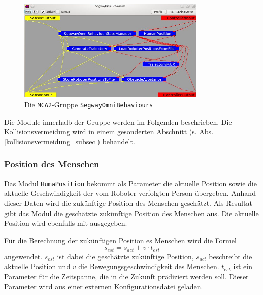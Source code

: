 \begin{figure}[h]
	\center
	\includegraphics[width=0.8\textwidth]{graphics/behaviours}
	\caption{Die \lstinline{MCA2}-Gruppe \lstinline{SegwayOmniBehaviours}}
	\label{fig:behaviours}
\end{figure}

Die Module innerhalb der Gruppe werden im Folgenden beschrieben.
Die Kollisionsvermeidung wird in einem gesonderten Abschnitt (s. Abs. \ref{kollisionsvermeidung_subsec}) behandelt.


\subsubsection{Position des Menschen}


Das Modul \lstinline{HumaPosition} bekommt als Parameter die aktuelle Position sowie die aktuelle Geschwindigkeit der vom Roboter verfolgten Person übergeben.
Anhand dieser Daten wird die zukünftige Position des Menschen geschätzt.
Als Resultat gibt das Modul die geschätzte zukünftige Position des Menschen aus.
Die aktuelle Position wird ebenfalls mit ausgegeben.

Für die Berechnung der zukünftigen Position es Menschen wird die Formel
\begin{equation}
	s_{est} = s_{act} + v \cdot t_{est}
\end{equation}
angewendet.
$s_{est}$ ist dabei die geschätzte zukünftige Position, $s_{act}$ beschreibt die aktuelle Position und $v$ die Bewegungsgeschwindigkeit des Menschen.
$t_{est}$ ist ein Parameter für die Zeitspanne, die in die Zukunft prädiziert werden soll.
Dieser Parameter wird aus einer externen Konfigurationsdatei geladen.


